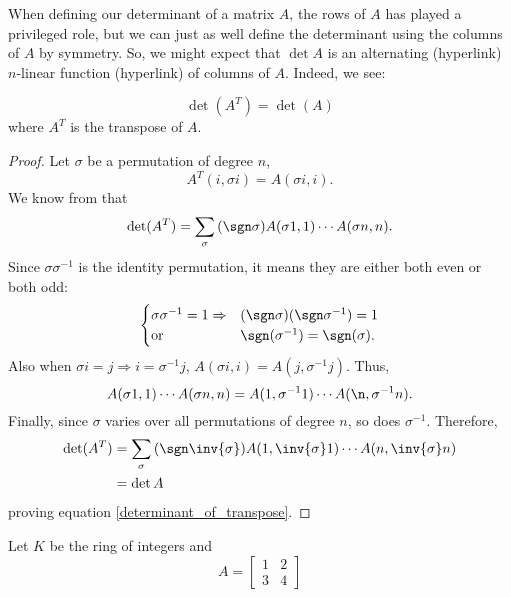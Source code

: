 \documentclass[main.tex]{subfiles}
\begin{document}
When defining our determinant of a matrix $A$, the rows of $A$ has played a privileged role, but we can just as well define the determinant using the columns of $A$ by symmetry. So, we might expect that $\det A$ is an alternating (hyperlink) $n$-linear function (hyperlink) of columns of $A$. Indeed, we see: 
\begin{prop}
\begin{equation}\label{determinant_of_transpose}
    \det (A^T) = \det(A)
\end{equation} 
where $A^T$ is the transpose of $A$.
\end{prop}
\begin{proof}
Let $\sigma$ be a permutation of degree $n$,
\begin{equation}
    A^T (i, \sigma i) = A (\sigma i, i).
\end{equation}
We know from \cite{} that 
\begin{equation}
    \det (A^T) = \sum_\sigma \, (\sgn \sigma) A(\sigma 1, 1) \cdots A(\sigma n, n).
\end{equation}
Since $\sigma \sigma ^{-1}$ is the identity permutation, it means they are either both even or both odd: 
\begin{equation}
    \begin{cases}
     \sigma \sigma^{-1} = 1 \Rightarrow &(\sgn \sigma)(\sgn \sigma^{-1}) = 1\\
    \text{or} & \sgn (\sigma ^{-1}) = \sgn (\sigma).
    \end{cases}
\end{equation}
Also when $\sigma i = j \Rightarrow i = \sigma^{-1}j$, $A(\sigma i, i) = A(j, \sigma^{-1}j)$. Thus,
\begin{equation}
    A(\sigma 1, 1) \cdots A(\sigma n, n) = A(1, \sigma^{-1}1) \cdots A(\n, \sigma^{-1} n). 
\end{equation}
Finally, since $\sigma$ varies over all permutations of degree $n$, so does $\sigma^{-1}$. Therefore, 
\begin{align}
    \det (A^T) &= \sum_\sigma \, (\sgn \inv{\sigma}) A(1, \inv{\sigma}1) \cdots A(n, \inv{\sigma}n)\\
    &= \det A
\end{align}
proving equation \ref{determinant_of_transpose}.
\end{proof}


\begin{example}
Let $K$ be the ring of integers and
\begin{equation*}
    A = 
    \begin{bmatrix}
        1 & 2\\
        3 & 4
    \end{bmatrix}
\end{equation*}

\end{example}
\end{document}
